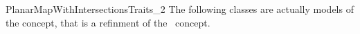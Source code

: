 \begin{ccRefConcept}{PlanarMapWithIntersectionsTraits_2}
\ccHasModels
The following classes are actually models of the  
concept, that is a refinment of the \ccRefName\ concept. 

  \\
  \\
   \\

\end{ccRefConcept}

\ccRefPageEnd
